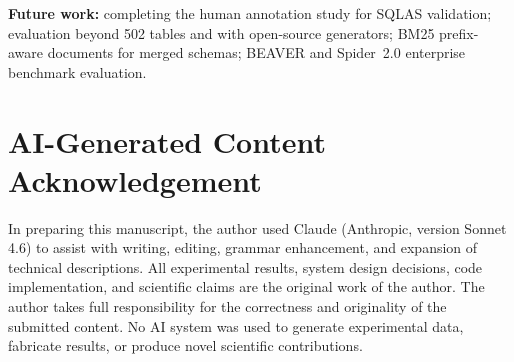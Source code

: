 \documentclass[conference]{IEEEtran}
\begin{document}
\textbf{Future work:} completing the human annotation study for SQLAS
validation; evaluation beyond 502 tables and with open-source
generators; BM25 prefix-aware documents for merged schemas; BEAVER and
Spider~2.0 enterprise benchmark evaluation.

\section*{AI-Generated Content Acknowledgement}
In preparing this manuscript, the author used Claude (Anthropic, version
Sonnet 4.6) to assist with writing, editing, grammar enhancement, and
expansion of technical descriptions. All experimental results, system
design decisions, code implementation, and scientific claims are the
original work of the author. The author takes full responsibility for
the correctness and originality of the submitted content. No AI system
was used to generate experimental data, fabricate results, or produce
novel scientific contributions.


\balance
\end{document}
